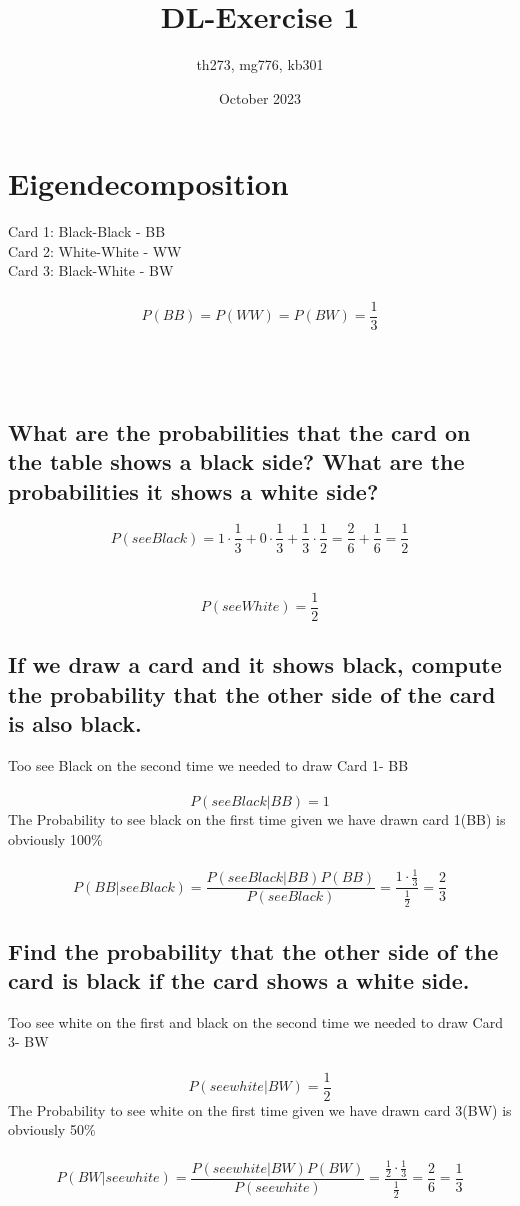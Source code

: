 \documentclass{article}
\title{DL-Exercise 1}
\author{th273, mg776, kb301}
\date{October 2023}
\begin{document}
\maketitle

\section{Eigendecomposition}
Card 1: Black-Black - BB
\\
Card 2: White-White - WW
\\
Card 3: Black-White - BW
\\\\
$$P(BB)=P(WW)=P(BW)=\frac{1}{3}$$
\\\\
\\
\subsection{What are the probabilities that the card on the table shows a black side? What are the probabilities it shows a white side?}
$$P(see Black)=1\cdot\frac{1}{3}+0\cdot\frac{1}{3}+\frac{1}{3}\cdot\frac{1}{2}=\frac{2}{6}+\frac{1}{6}=\frac{1}{2}$$
\\\\
$$P(see White)=\frac{1}{2}$$
\subsection{If we draw a card and it shows black, compute the probability that the other side of the card is also black.}
Too see Black on the second time we needed to draw Card 1- BB
\\\\
$$P(see Black|BB) = 1$$ The Probability to see black on the first time given we have drawn card 1(BB) is obviously 100\%
\\\\
$$P(BB| see Black)=\frac{P(see Black|BB) P(BB)}{P(see Black)}=\frac{1\cdot\frac{1}{3}}{\frac{1}{2}}=\frac{2}{3}$$
\subsection{Find the probability that the other side of the card is black if the card shows a white side.}
Too see white on the first and black on the second time we needed to draw Card 3- BW
\\\\
$$P(see white|BW) = \frac{1}{2}$$ The Probability to see white on the first time given we have drawn card 3(BW) is obviously 50\%
\\\\
$$P(BW| see white)=\frac{P(see white|BW) P(BW)}{P(see white)}=\frac{\frac{1}{2}\cdot\frac{1}{3}}{\frac{1}{2}}=\frac{2}{6}=\frac{1}{3}$$
\pagebreak
\end{document}
